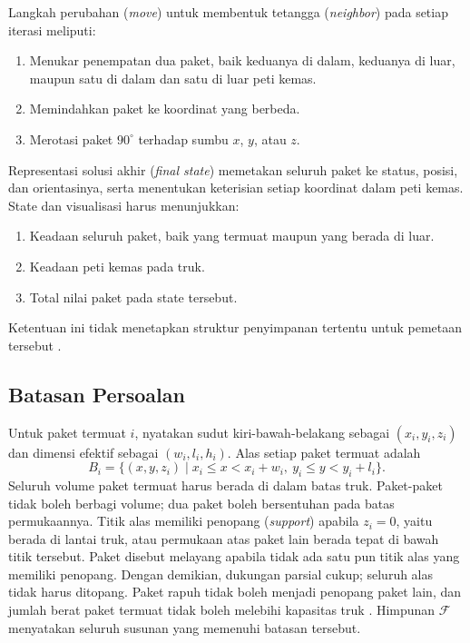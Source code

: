 \documentclass[12pt,a4paper]{article}
\begin{document}
Langkah perubahan (\textit{move}) untuk membentuk tetangga (\textit{neighbor}) pada setiap iterasi meliputi:
\begin{enumerate}
    \setlength{\itemsep}{0pt}
    \setlength{\parsep}{0pt}
    \item Menukar penempatan dua paket, baik keduanya di dalam, keduanya di luar, maupun satu di dalam dan satu di luar peti kemas.
    \item Memindahkan paket ke koordinat yang berbeda.
    \item Merotasi paket $90^\circ$ terhadap sumbu $x$, $y$, atau $z$.
\end{enumerate}
Representasi solusi akhir (\textit{final state}) memetakan seluruh paket ke status, posisi, dan orientasinya, serta menentukan keterisian setiap koordinat dalam peti kemas. State dan visualisasi harus menunjukkan:
\begin{enumerate}
    \setlength{\itemsep}{0pt}
    \setlength{\parsep}{0pt}
    \item Keadaan seluruh paket, baik yang termuat maupun yang berada di luar.
    \item Keadaan peti kemas pada truk.
    \item Total nilai paket pada state tersebut.
\end{enumerate}
Ketentuan ini tidak menetapkan struktur penyimpanan tertentu untuk pemetaan tersebut \cite{spesifikasi}.

\subsection{Batasan Persoalan}\label{sec:constraint-persoalan}
Untuk paket termuat $i$, nyatakan sudut kiri-bawah-belakang sebagai $(x_i,y_i,z_i)$ dan dimensi efektif sebagai $(w_i,l_i,h_i)$. Alas setiap paket termuat adalah
\begin{equation}
 B_i=\{(x,y,z_i)\mid x_i\leq x<x_i+w_i,\ y_i\leq y<y_i+l_i\}.
 \label{eq:alas-paket}
\end{equation}
Seluruh volume paket termuat harus berada di dalam batas truk. Paket-paket tidak boleh berbagi volume; dua paket boleh bersentuhan pada batas permukaannya. Titik alas memiliki penopang (\textit{support}) apabila $z_i=0$, yaitu berada di lantai truk, atau permukaan atas paket lain berada tepat di bawah titik tersebut. Paket disebut melayang apabila tidak ada satu pun titik alas yang memiliki penopang. Dengan demikian, dukungan parsial cukup; seluruh alas tidak harus ditopang. Paket rapuh tidak boleh menjadi penopang paket lain, dan jumlah berat paket termuat tidak boleh melebihi kapasitas truk \cite{spesifikasi}. Himpunan $\mathcal{F}$ menyatakan seluruh susunan yang memenuhi batasan tersebut.
\end{document}
